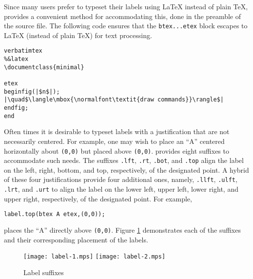 Since many \MP{} users prefer to typeset their labels using \LaTeX{}
instead of plain \TeX, \MP{} provides a convenient method for
accommodating this, done in the preamble of the \MP{} source file.  The
following code ensures that the \verb|btex...etex| block escapes to
\LaTeX{} (instead of plain \TeX) for text processing.

\begin{lstlisting}[xleftmargin=56bp]
verbatimtex
%&latex
\documentclass{minimal}

etex
beginfig(|$n$|);
|\quad$\langle\mbox{\normalfont\textit{draw commands}}\rangle$|
endfig;
end
\end{lstlisting}

Often times it is desirable to typeset labels with a justification that
are not necessarily centered.  For example, one may wish to place an
``A'' centered horizontally about \texttt{(0,0)} but placed above
\texttt{(0,0)}. \MP{} provides eight suffixes to accommodate such needs.
The suffixes \texttt{.lft}, \texttt{.rt}, \texttt{.bot}, and
\texttt{.top} align the label on the left, right, bottom, and top,
respectively, of the designated point.  A hybrid of these four
justifications provide four additional ones, namely, \texttt{.llft},
\texttt{.ulft}, \texttt{.lrt}, and \texttt{.urt} to align the label on
the lower left, upper left, lower right, and upper right, respectively,
of the designated point.  For example,

\begin{center}
  \verb|label.top(btex A etex,(0,0));|
\end{center}
places the ``A'' directly above \texttt{(0,0)}.  Figure \ref{fig:label}
demonstrates each of the suffixes and their corresponding placement of
the labels.

\begin{figure}
  \hfill%
  \texttt{[image: label-1.mps]}
  \hfill%
  \texttt{[image: label-2.mps]}
  \hfill\mbox{}
  \caption{Label suffixes}
  \label{fig:label}
\end{figure}
